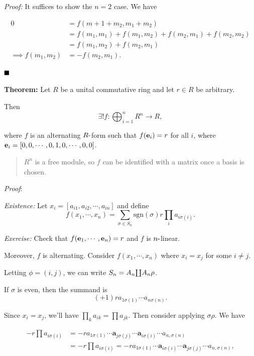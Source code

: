 \emph{Proof:} It suffices to show the \(n=2\) case. We have

\begin{align*}
0
&= f(m+1 + m_2, m_1 + m_2) \\
&= f(m_1, m_1) + f(m_1, m_2) + f(m_2, m_1) + f(m_2, m_2) \\
&= f(m_1, m_2) + f(m_2, m_1)\\
\implies f(m_1, m_2) &= - f(m_2, m_1)
.\end{align*}

\(\qed\)

\textbf{Theorem:} Let \(R\) be a unital commutative ring and let
\(r\in R\) be arbitrary.

Then \[
\exists! f: \bigoplus_{i=1}^n R^n \to R
,\]

where \(f\) is an alternating \(R{\hbox{-}}\)form such that
\(f(\mathbf{e}_i) = r\) for all \(i\), where
\(\mathbf{e}_i = [0, 0, \cdots, 0, 1, 0, \cdots, 0, 0]\).

\begin{quote}
\(R^n\) is a free module, so \(f\) can be identified with a matrix once
a basis is chosen.
\end{quote}

\emph{Proof}:

\emph{Existence:} Let \(x_i = [a_{i1}, a_{i2}, \cdots, a_{in}]\) and
define \[
f(x_1, \cdots, x_n) = \sum_{\sigma \in S_n} \mathrm{sgn}(\sigma) r \prod_i a_{i \sigma(i)}
.\]

\emph{Exercise:} Check that \(f(\mathbf{e}_1, \cdots, \mathbf{e}_n) = r\)
and \(f\) is \(n{\hbox{-}}\)linear.

Moreover, \(f\) is alternating. Consider \(f(x_1, \cdots, x_n)\) where
\(x_i = x_j\) for some \(i\neq j\).

Letting \(\phi = (i, j)\), we can write
\(S_n = A_n {\coprod} A_n \rho\).

If \(\sigma\) is even, then the summand is \[
(+1)r a_{1\sigma(1)} \cdots a_{n\sigma(n)}
.\]

Since \(x_i = x_j\), we'll have \(\prod_k a_{ik} = \prod a_{jk}\). Then
consider applying \(\sigma \rho\). We have

\begin{align*}
-r \prod a_{i\sigma(i)}
&= -r a_{1\sigma(1)} \cdots \mathbf{a}_{j \sigma(j)} \cdots \mathbf{a}_{i \sigma(i)} \cdots a_{n, \sigma(n)} \\
&=
-r \prod a_{i\sigma(i)}
= -r a_{1\sigma(1)} \cdots \mathbf{a}_{i \sigma(i)} \cdots \mathbf{a}_{j \sigma(j)} \cdots a_{n, \sigma(n)}
,\end{align*}

